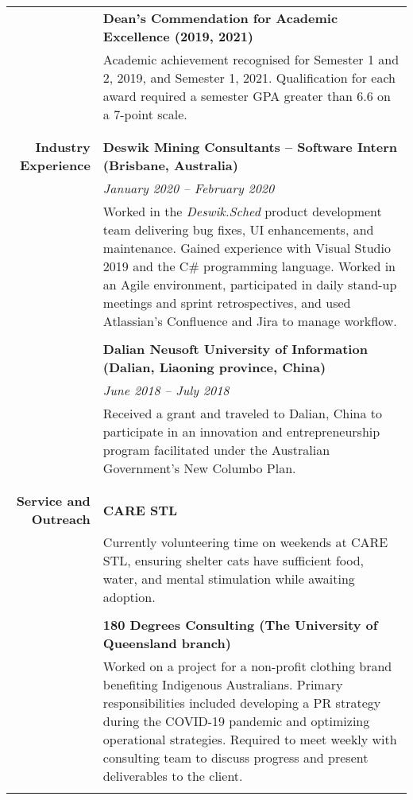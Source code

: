 \documentclass{article}
\begin{document}
\begin{longtable}{r | p{13cm}}
											& \large\textbf{Dean's Commendation for Academic Excellence (2019, 2021)} \\
											& Academic achievement recognised for Semester 1 and 2, 2019, and Semester 1, 2021. Qualification for each award required a semester GPA greater than 6.6 on a 7-point scale. \\
											& \\
											\hline \\

		\large\textbf{Industry Experience} 	& \large\textbf{Deswik Mining Consultants – Software Intern (Brisbane, Australia)} \\
											& \textit{January 2020 – February 2020} \\
											& Worked in the \textit{Deswik.Sched} product development team delivering bug fixes, UI enhancements, and maintenance. Gained experience with Visual Studio 2019 and the C\# programming language. Worked in an Agile environment, participated in daily stand-up meetings and sprint retrospectives, and used Atlassian’s Confluence and Jira to manage workflow. \\ 
											& \\

											& \large\textbf{Dalian Neusoft University of Information (Dalian, Liaoning province, China)} \\
											& \textit{June 2018 – July 2018} \\
											& Received a grant and traveled to Dalian, China to participate in an innovation and entrepreneurship program facilitated under the Australian Government’s New Columbo Plan. \\
											& \\
											\hline \\

		\large\textbf{Service and Outreach} & \large\textbf{CARE STL} \\
											& Currently volunteering time on weekends at CARE STL, ensuring shelter cats have sufficient food, water, and mental stimulation while awaiting adoption. \\	
											& \\

											& \large\textbf{180 Degrees Consulting (The University of Queensland branch)} \\
											& Worked on a project for a non-profit clothing brand benefiting Indigenous Australians. Primary responsibilities included developing a PR strategy during the COVID-19 pandemic and optimizing operational strategies. Required to meet weekly with consulting team to discuss progress and present deliverables to the client. \\	
											& \\
											\hline
											

\end{longtable}
\end{document}
